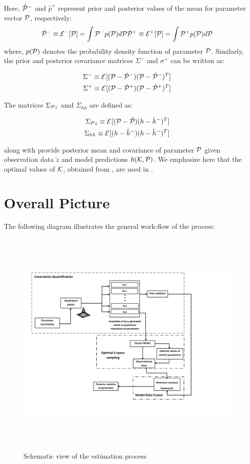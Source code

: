 \documentclass[]{article}
\begin{document}
Here, $\hat{\mathcal{P}}^-$ and $\hat{p}^+$ represent prior and posterior values of the mean for parameter vector $\mathcal{P}$, respectively:
\begin{eqnarray}
\hat{\mathcal{P}}^-\equiv \mathcal{E}^{-}[\mathcal{P}]=\int \mathcal{P}^- p(\mathcal{P})d\mathcal{P} \label{Pprior}
\hat{\mathcal{P}}^+\equiv \mathcal{E}^{+}[\mathcal{P}]=\int \mathcal{P}^+ p(\mathcal{P})d\mathcal{P} \label{Pposterior}
\end{eqnarray}
where, $p(\mathcal{P})$ denotes the probability density function of parameter $\mathcal{P}$. Similarly, the prior and posterior covariance matrices $\Sigma^{-}$ and $\sigma^+$ can be written as:

\begin{eqnarray}
\Sigma^-\equiv\mathcal{E}^{}[(\mathcal{P}-\hat{\mathcal{P}}^-)(\mathcal{P}-\hat{\mathcal{P}}^-)^T]\\
\Sigma^+\equiv\mathcal{E}^{}[(\mathcal{P}-\hat{\mathcal{P}}^+)(\mathcal{P}-\hat{\mathcal{P}}^+)^T]
\end{eqnarray}

The matrices $\Sigma_{\mathcal{P} z}$ amd $\Sigma_{hh}$ are defined as:

\begin{eqnarray}
\Sigma_{\mathcal{P} z} \equiv\mathcal{E}^{}[(\mathcal{P}-\hat{\mathcal{P}})(h-\hat{h}^-)^T]\\
\Sigma_{hh} \equiv\mathcal{E}^{}[(h-\hat{h}^-)(h-\hat{h}^-)^T]
\end{eqnarray}

 along with  provide posterior mean and covariance of parameter $\mathcal{P}$ given observation data $\tilde{z}$ and model predictions $h(\mathcal{K},\mathcal{P})$.
We emphasize here that the optimal values of $\mathcal{K}$, obtained from , are used in .

\section*{Overall Picture}
The following diagram illustrates the general work-flow of the process:
\begin{figure}[h!!]
\center
\includegraphics[trim = 1.5cm 3cm 8cm 0.5cm, clip,width=5in,height=4.5in]{flowchart.pdf}
\caption{Schematic view of the estimation process}
\end{figure}
\end{document}
